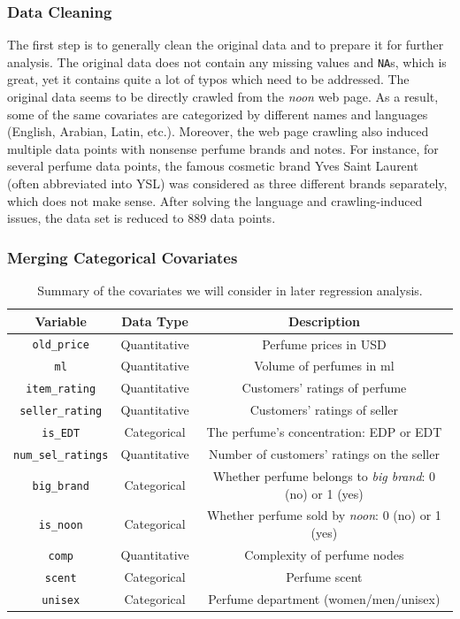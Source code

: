 \documentclass[12pt]{amsart}
\begin{document}
\subsubsection{Data Cleaning} The first step is to generally clean the original data and to prepare it for further analysis. The original data does not contain any missing values and \texttt{NA}s, which is great, yet it contains quite a lot of typos which need to be addressed. The original data seems to be directly crawled from the \textit{noon} web page. As a result, some of the same covariates are categorized by different names and languages (English, Arabian, Latin, etc.). Moreover, the web page crawling also induced multiple data points with nonsense perfume brands and notes. For instance, for several perfume data points, the famous cosmetic brand Yves Saint Laurent (often abbreviated into YSL) was considered as three different brands separately, which does not make sense. After solving the language and crawling-induced issues, the data set is reduced to 889 data points.

\subsubsection{Merging Categorical Covariates}

\begin{table}[!ht]
    \centering
    \renewcommand{\arraystretch}{1.2}
        \begin{tabular}{ c c c }
        \hline
             \textbf{Variable} & \textbf{Data Type} & \textbf{Description} \\ \hline
             \texttt{old\_price} & Quantitative & Perfume prices in USD \\  
             \texttt{ml} &Quantitative & Volume of perfumes in ml \\
             \texttt{item\_rating} & Quantitative & Customers’ ratings of perfume \\
             \texttt{seller\_rating} & Quantitative & Customers' ratings of seller \\
             \texttt{is\_EDT} & Categorical & The perfume’s concentration: EDP or EDT \\
             \texttt{num\_sel\_ratings} & Quantitative & Number of customers’ ratings on the seller \\
             \texttt{big\_brand} & Categorical & Whether perfume belongs to \emph{big brand}: 0 (no) or 1 (yes) \\
             \texttt{is\_noon} & Categorical & Whether perfume sold by \emph{noon}: 0 (no) or 1 (yes) \\
             \texttt{comp} & Quantitative & Complexity of perfume nodes \\
             \texttt{scent} & Categorical & Perfume scent \\
             \texttt{unisex} & Categorical & Perfume department (women/men/unisex)\\
             \hline
        \end{tabular}
 \vspace{10pt}
 \caption{Summary of the covariates we will consider in later regression analysis.}
\label{tab:1}
\end{table}
\end{document}
